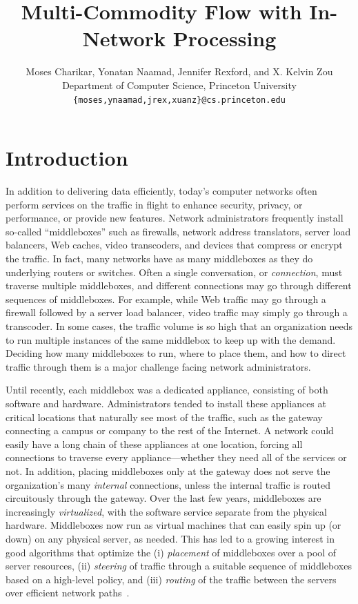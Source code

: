 \documentclass[11pt]{article}
\title{Multi-Commodity Flow with In-Network Processing}
\author{Moses Charikar, Yonatan Naamad, Jennifer Rexford, and X. Kelvin Zou\\
Department of Computer Science, Princeton University\\
\texttt{\{moses,ynaamad,jrex,xuanz\}@cs.princeton.edu}}
\date{}
\begin{document}
\maketitle
\thispagestyle{empty}

\section{Introduction}
In addition to delivering data efficiently, today's computer networks often perform services on the traffic in flight to enhance security, privacy, or performance, or provide new features.  Network administrators frequently install so-called ``middleboxes'' such as firewalls, network address translators, server load balancers, Web caches, video transcoders, and devices that compress or encrypt the traffic.  In fact, many networks have as many middleboxes as they do underlying routers or switches.  Often a single conversation, or \emph{connection}, must traverse multiple middleboxes, and different connections may go through different sequences of middleboxes.  For example, while Web traffic may go through a firewall followed by a server load balancer, video traffic may simply go through a transcoder.  In some cases, the traffic volume is so high that an organization needs to run multiple instances of the same middlebox to keep up with the demand.  Deciding how many middleboxes to run, where to place them, and how to direct traffic through them is a major challenge facing network administrators.

Until recently, each middlebox was a dedicated appliance, consisting of both software and hardware.  Administrators tended to install these appliances at critical locations that naturally see most of the traffic, such as the gateway connecting a campus or company to the rest of the Internet.  A network could easily have a long chain of these appliances at one location, forcing all connections to traverse every appliance---whether they need all of the services or not.  In addition, placing middleboxes only at the gateway does not serve the organization's many \emph{internal} connections, unless the internal traffic is routed circuitously through the gateway.
%
Over the last few years, middleboxes are increasingly \emph{virtualized}, with the software service separate from the physical hardware.  Middleboxes now run as virtual machines that can easily spin up (or down) on any physical server, as needed.  This has led to a growing interest in good algorithms that optimize the (i) \emph{placement} of middleboxes over a pool of server resources, (ii) \emph{steering} of traffic through a suitable sequence of middleboxes based on a high-level policy, and (iii) \emph{routing} of the traffic between the servers over efficient network paths~\cite{SIMPLE2013}.
\end{document}
